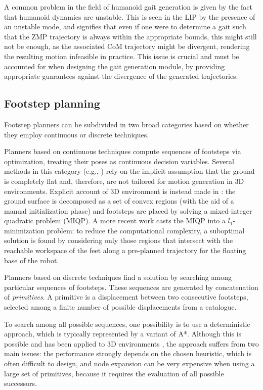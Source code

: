A common problem in the field of humanoid gait generation is given by the fact that humanoid dynamics are unstable. This is seen in the LIP by the presence of an unstable mode, and signifies that even if one were to determine a gait such that the ZMP trajectory is always within the appropriate bounds, this might still not be enough, as the associated CoM trajectory might be divergent, rendering the resulting motion infeasible in practice. This issue is crucial and must be accounted for when designing the gait generation module, by providing appropriate guarantees against the divergence of the generated trajectories.

\subsection{Footstep planning}

Footstep planners can be subdivided in two broad categories based on whether they employ continuous or discrete techniques.

Planners based on continuous techniques compute sequences of footsteps via optimization, treating their poses as continuous decision variables. 
Several methods in this category (e.g., \cite{Ibanez2014IROS, Hong2011TSMC, Kasadei2021SNAS}) rely on the implicit assumption that the ground is completely flat and, therefore, are not tailored for motion generation in 3D environments.
Explicit account of 3D environment is instead made in \cite{Deits2014FootstepPlanningMIQCQP}: the ground surface is decomposed as a set of convex regions (with the aid of a manual initialization phase) and footsteps are placed by solving a mixed-integer quadratic problem (MIQP). 
A more recent work \cite{Song2021RAL} casts the MIQP into a $l_1$-minimization problem: 
to reduce the computational complexity, a suboptimal solution is found by considering only those regions that intersect with the reachable workspace of the feet along a pre-planned trajectory for the floating base of the robot.

Planners based on discrete techniques find a solution by searching among particular sequences of footsteps. These sequences are generated by concatenation of \emph{primitives}. A primitive is a displacement between two consecutive footsteps, selected among a finite number of possible displacements from a catalogue.

To search among all possible sequences, one possibility is to use a deterministic approach, which is typically represented by a variant of A*. Although this is possible and has been applied to 3D environments \cite{Griffin2019ICRA}, the approach suffers from two main issues: the performance strongly depends on the chosen heuristic, which is often difficult to design, and node expansion can be very expensive when using a large set of primitives, because it requires the evaluation of all possible successors.

